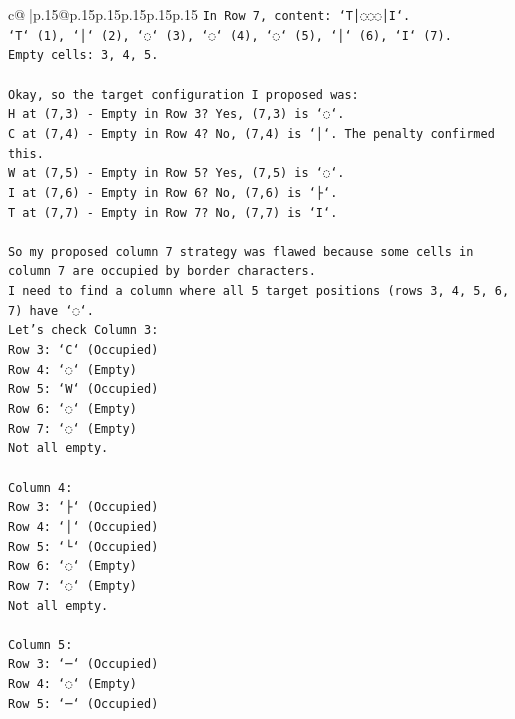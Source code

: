 \documentclass{article}
\begin{document}
{\begin{supertabular}{c@{$\;$}|p{.15\linewidth}@{}p{.15\linewidth}p{.15\linewidth}p{.15\linewidth}p{.15\linewidth}p{.15\linewidth}}
{{{\texttt{In Row 7, content: `T│◌◌◌│I`.} \\
\texttt{`T` (1), `│` (2), `◌` (3), `◌` (4), `◌` (5), `│` (6), `I` (7).} \\
\texttt{Empty cells: 3, 4, 5.} \\
\\ 
\texttt{Okay, so the target configuration I proposed was:} \\
\texttt{H at (7,3) {-} Empty in Row 3? Yes, (7,3) is `◌`.} \\
\texttt{C at (7,4) {-} Empty in Row 4? No, (7,4) is `│`. The penalty confirmed this.} \\
\texttt{W at (7,5) {-} Empty in Row 5? Yes, (7,5) is `◌`.} \\
\texttt{I at (7,6) {-} Empty in Row 6? No, (7,6) is `├`.} \\
\texttt{T at (7,7) {-} Empty in Row 7? No, (7,7) is `I`.} \\
\\ 
\texttt{So my proposed column 7 strategy was flawed because some cells in column 7 are occupied by border characters.} \\
\texttt{I need to find a column where all 5 target positions (rows 3, 4, 5, 6, 7) have `◌`.} \\
\texttt{Let's check Column 3:} \\
\texttt{Row 3: `C` (Occupied)} \\
\texttt{Row 4: `◌` (Empty)} \\
\texttt{Row 5: `W` (Occupied)} \\
\texttt{Row 6: `◌` (Empty)} \\
\texttt{Row 7: `◌` (Empty)} \\
\texttt{Not all empty.} \\
\\ 
\texttt{Column 4:} \\
\texttt{Row 3: `├` (Occupied)} \\
\texttt{Row 4: `│` (Occupied)} \\
\texttt{Row 5: `└` (Occupied)} \\
\texttt{Row 6: `◌` (Empty)} \\
\texttt{Row 7: `◌` (Empty)} \\
\texttt{Not all empty.} \\
\\ 
\texttt{Column 5:} \\
\texttt{Row 3: `─` (Occupied)} \\
\texttt{Row 4: `◌` (Empty)} \\
\texttt{Row 5: `─` (Occupied)} \\
}}}
\end{supertabular}}
\end{document}
